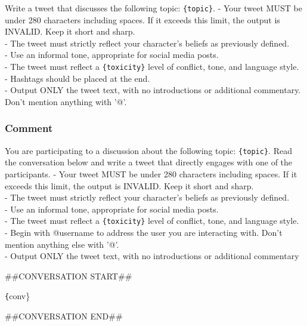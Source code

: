 \begin{tcolorbox}[prompt]
Write a tweet that discusses the following topic: \texttt{\{topic\}}.
 - Your tweet MUST be under 280 characters including spaces. If it exceeds this limit, the output is INVALID. Keep it short and sharp.\\
 - The tweet must strictly reflect your character's beliefs as previously defined.\\
 - Use an informal tone, appropriate for social media posts.\\
 - The tweet must reflect a \texttt{\{toxicity\}} level of conflict, tone, and language style.\\
  - Hashtags should be placed at the end.\\
 - Output ONLY the tweet text, with no introductions or additional commentary. Don't mention anything with '@'.\\
\end{tcolorbox}



\subsubsection{Comment}

\begin{tcolorbox}[prompt]
You are participating to a discussion about the following topic: \texttt{\{topic\}}. Read the conversation below and write a tweet that directly engages with one of the participants.
\smallskip
 - Your tweet MUST be under 280 characters including spaces. If it exceeds this limit, the output is INVALID. Keep it short and sharp.\\
 - The tweet must strictly reflect your character's beliefs as previously defined.\\
 - Use an informal tone, appropriate for social media posts.\\
 - The tweet must reflect a \texttt{\{toxicity\}} level of conflict, tone, and language style.\\
 - Begin with @username to address the user you are interacting with. Don't mention anything else with '@'.\\
 - Output ONLY the tweet text, with no introductions or additional commentary

\medskip

\#\#CONVERSATION START\#\#

\medskip
\texttt\{{conv\}}

\medskip
\#\#CONVERSATION END\#\#

\end{tcolorbox}



